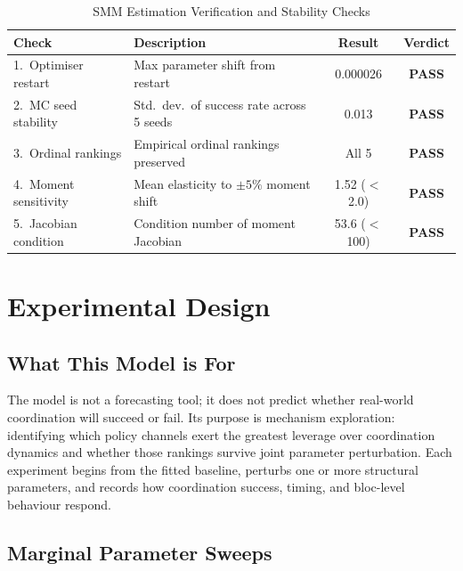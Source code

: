 \documentclass[10pt,a4paper]{article}
\begin{document}
\begin{table}[htbp]
\centering
\small
\caption{SMM Estimation Verification and Stability Checks}
\label{tab:smm_verification}
\begin{tabular}{llcc}
\toprule
\textbf{Check} & \textbf{Description} & \textbf{Result} & \textbf{Verdict} \\
\midrule
1.\ Optimiser restart   & Max parameter shift from restart               & 0.000026     & \textbf{PASS} \\
2.\ MC seed stability   & Std.\ dev.\ of success rate across 5 seeds     & 0.013        & \textbf{PASS} \\
3.\ Ordinal rankings    & Empirical ordinal rankings preserved           & All 5        & \textbf{PASS} \\
4.\ Moment sensitivity  & Mean elasticity to $\pm5\%$ moment shift        & 1.52 ($<$2.0)& \textbf{PASS} \\
5.\ Jacobian condition  & Condition number of moment Jacobian            & 53.6 ($<$100)& \textbf{PASS} \\
\bottomrule
\end{tabular}
\end{table}

\clearpage
\needspace{12em}
\section{Experimental Design}

\needspace{12em}
\subsection*{What This Model is For}

The model is not a forecasting tool; it does not predict whether real-world coordination will succeed or fail. Its purpose is mechanism exploration: identifying which policy channels exert the greatest leverage over coordination dynamics and whether those rankings survive joint parameter perturbation. Each experiment begins from the fitted baseline, perturbs one or more structural parameters, and records how coordination success, timing, and bloc-level behaviour respond.

\needspace{12em}
\subsection*{Marginal Parameter Sweeps}
\end{document}
